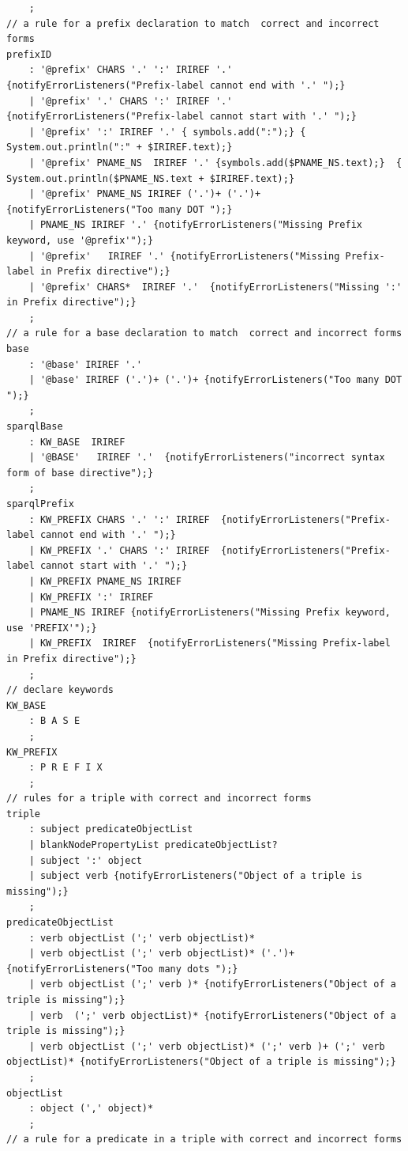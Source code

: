 \begin{appendices}
\begin{lstlisting}
	;
// a rule for a prefix declaration to match  correct and incorrect forms
prefixID
    : '@prefix' CHARS '.' ':' IRIREF '.' {notifyErrorListeners("Prefix-label cannot end with '.' ");}
    | '@prefix' '.' CHARS ':' IRIREF '.' {notifyErrorListeners("Prefix-label cannot start with '.' ");}
    | '@prefix' ':' IRIREF '.' { symbols.add(":");} { System.out.println(":" + $IRIREF.text);} 
    | '@prefix' PNAME_NS  IRIREF '.' {symbols.add($PNAME_NS.text);}  { System.out.println($PNAME_NS.text + $IRIREF.text);} 
    | '@prefix' PNAME_NS IRIREF ('.')+ ('.')+ {notifyErrorListeners("Too many DOT ");}
    | PNAME_NS IRIREF '.' {notifyErrorListeners("Missing Prefix keyword, use '@prefix'");}
    | '@prefix'   IRIREF '.' {notifyErrorListeners("Missing Prefix-label in Prefix directive");}
    | '@prefix' CHARS*  IRIREF '.'  {notifyErrorListeners("Missing ':' in Prefix directive");}
    ;
// a rule for a base declaration to match  correct and incorrect forms
base
    : '@base' IRIREF '.'
    | '@base' IRIREF ('.')+ ('.')+ {notifyErrorListeners("Too many DOT ");}
    ;
sparqlBase
    : KW_BASE  IRIREF 
    | '@BASE'   IRIREF '.'  {notifyErrorListeners("incorrect syntax form of base directive");}
    ;
sparqlPrefix
    : KW_PREFIX CHARS '.' ':' IRIREF  {notifyErrorListeners("Prefix-label cannot end with '.' ");}
    | KW_PREFIX '.' CHARS ':' IRIREF  {notifyErrorListeners("Prefix-label cannot start with '.' ");}
    | KW_PREFIX PNAME_NS IRIREF
    | KW_PREFIX ':' IRIREF
    | PNAME_NS IRIREF {notifyErrorListeners("Missing Prefix keyword, use 'PREFIX'");}
    | KW_PREFIX  IRIREF  {notifyErrorListeners("Missing Prefix-label in Prefix directive");}
    ;
// declare keywords
KW_BASE 
    : B A S E 
    ;
KW_PREFIX 
    : P R E F I X 
    ;
// rules for a triple with correct and incorrect forms
triple
    : subject predicateObjectList
    | blankNodePropertyList predicateObjectList?
    | subject ':' object 
    | subject verb {notifyErrorListeners("Object of a triple is missing");}
    ;
predicateObjectList
    : verb objectList (';' verb objectList)*
    | verb objectList (';' verb objectList)* ('.')+ {notifyErrorListeners("Too many dots ");}
    | verb objectList (';' verb )* {notifyErrorListeners("Object of a triple is missing");}
    | verb  (';' verb objectList)* {notifyErrorListeners("Object of a triple is missing");}
    | verb objectList (';' verb objectList)* (';' verb )+ (';' verb objectList)* {notifyErrorListeners("Object of a triple is missing");}
    ;
objectList
    : object (',' object)*
    ;
// a rule for a predicate in a triple with correct and incorrect forms

\end{lstlisting}
\end{appendices}
